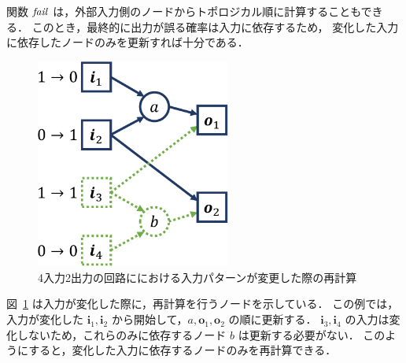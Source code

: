 関数 ${\it fail}$ は，外部入力側のノードからトポロジカル順に計算することもできる．
このとき，最終的に出力が誤る確率は入力に依存するため，
変化した入力に依存したノードのみを更新すれば十分である．
\begin{figure}[tbp]
  \begin{center}
    \includegraphics[width=64mm,clip]{img/update_graph.pdf}
  \end{center}
  \caption{4入力2出力の回路ににおける入力パターンが変更した際の再計算}
\label{fig:update_graph}
\end{figure}
図~\ref{fig:update_graph} は入力が変化した際に，再計算を行うノードを示している．
この例では，入力が変化した ${\bm i}_1, {\bm i}_2$ から開始して，$a, {\bm o}_1, {\bm o}_2$ の順に更新する．
${\bm i}_3, {\bm i}_4$ の入力は変化しないため，これらのみに依存するノード $b$ は更新する必要がない．
このようにすると，変化した入力に依存するノードのみを再計算できる．

